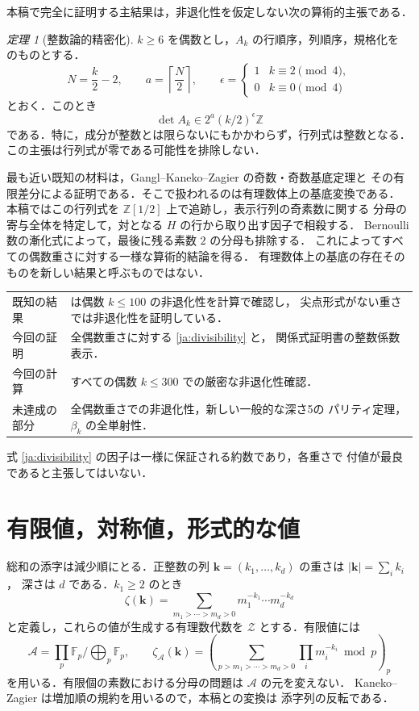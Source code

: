 \documentclass[12pt]{amsart}
\theoremstyle{definition}
\theoremstyle{remark}
\numberwithin{equation}{section}
\newcommand{\Z}{\mathbb{Z}}
\newcommand{\za}{\zeta_{\mathcal A}}
\newtheorem{jthm}[thm]{定理}
\theoremstyle{definition}
\theoremstyle{remark}
\begin{document}
本稿で完全に証明する主結果は，非退化性を仮定しない次の算術的主張である．
\begin{jthm}[整数論的精密化]\label{ja:main}
$k\geq6$ を偶数とし，$A_k$ の行順序，列順序，規格化を
\cite[(5.28)--(5.31)]{jBR} のものとする．
\[
 N=\frac{k}{2}-2,\qquad a=\left\lceil\frac N2\right\rceil,
 \qquad \epsilon=\begin{cases}1&k\equiv2\pmod4,\\0&k\equiv0\pmod4
 \end{cases}
\]
とおく．このとき
\begin{equation}\label{ja:divisibility}
 \boxed{\det A_k\in2^a(k/2)^\epsilon\Z}
\end{equation}
である．特に，成分が整数とは限らないにもかかわらず，行列式は整数となる．
この主張は行列式が零である可能性を排除しない．
\end{jthm}

最も近い既知の材料は，Gangl--Kaneko--Zagier
\cite[Theorem 2 および \S4, Proposition 3]{jGKZ} の奇数・奇数基底定理と
その有限差分による証明である．そこで扱われるのは有理数体上の基底変換である．
本稿ではこの行列式を $\Z[1/2]$ 上で追跡し，表示行列の奇素数に関する
分母の寄与全体を特定して，対となる $H$ の行から取り出す因子で相殺する．
Bernoulli 数の漸化式によって，最後に残る素数 $2$ の分母も排除する．
これによってすべての偶数重さに対する一様な算術的結論を得る．
有理数体上の基底の存在そのものを新しい結果と呼ぶものではない．

\begin{center}
\begin{tabular}{p{}p{}}
\toprule
既知の結果 & \cite{jBR} は偶数 $k\leq100$ の非退化性を計算で確認し，
尖点形式がない重さでは非退化性を証明している．\\
今回の証明 & 全偶数重さに対する \eqref{ja:divisibility} と，
関係式証明書の整数係数表示．\\
今回の計算 & すべての偶数 $k\leq300$ での厳密な非退化性確認．\\
未達成の部分 & 全偶数重さでの非退化性，新しい一般的な深さ5の
パリティ定理，$\beta_k$ の全単射性．\\
\bottomrule
\end{tabular}
\end{center}
式 \eqref{ja:divisibility} の因子は一様に保証される約数であり，各重さで
付値が最良であると主張してはいない．

\section{有限値，対称値，形式的な値}
総和の添字は減少順にとる．正整数の列
$\boldsymbol k=(k_1,\ldots,k_d)$ の重さは $|\boldsymbol k|=\sum_i k_i$，
深さは $d$ である．$k_1\geq2$ のとき
\[
 \zeta(\boldsymbol k)=\sum_{m_1>\cdots>m_d>0}
 m_1^{-k_1}\cdots m_d^{-k_d}
\]
と定義し，これらの値が生成する有理数代数を $\mathcal Z$ とする．有限値には
\[
 \mathcal A=\prod_p\mathbb F_p\big/\bigoplus_p\mathbb F_p,
 \qquad
 \za(\boldsymbol k)=
 \left(\sum_{p>m_1>\cdots>m_d>0}\prod_i m_i^{-k_i}\bmod p\right)_p
\]
を用いる．有限個の素数における分母の問題は $\mathcal A$ の元を変えない．
Kaneko--Zagier \cite{jKZ} は増加順の規約を用いるので，本稿との変換は
添字列の反転である．
\end{document}
